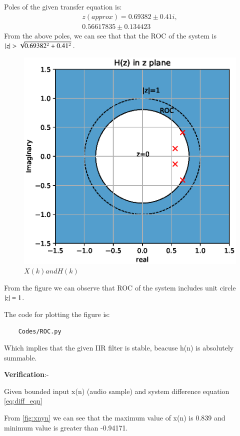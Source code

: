 \documentclass[journal,12pt,twocolumn]{IEEEtran}
\renewcommand\thesection{\arabic{section}}
\begin{document}
\begin{enumerate}[label=\thesection.\arabic*,ref=\thesection.\theenumi]
Poles of the given transfer equation is:
\begin{equation}
\begin{split}
z(approx) = 0.69382 \pm 0.41i,
\\
 0.56617835 \pm 0.134423
\end{split}  
\end{equation}
From the above poles, we can see that that the ROC of the system is $\left\vert z\right\vert>\sqrt{0.69382^{2}+0.41^{2}}$.
\begin{figure}[!ht]
\centering
\includegraphics[width=\columnwidth]{./figs/ROC.eps}
\caption{$X(k) and H(k)$}
\label{fig:xnhnfft}
\end{figure}
From the figure we can observe that ROC of the system includes unit circle $\left\vert z\right\vert=1$.

The code for plotting the figure is:
\begin{lstlisting}
    Codes/ROC.py
\end{lstlisting}

Which implies that the given IIR filter is stable, beacuse h(n) is absolutely summable.

\textbf{Verification}:-

Given bounded input x(n) (audio sample) and system difference equation \ref{eq:diff_eqn}

From \ref{fig:xnyn} we can see that the maximum value of x(n) is 0.839 and minimum value is greater than -0.94171.


\end{enumerate}
\end{document}
